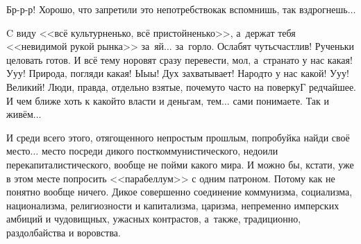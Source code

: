 Бр-р-р! Хорошо, что запретили это непотребство\mdash как вспомнишь, так вздрогнешь$\ldots$



C виду <<всё культурненько, всё пристойненько>>, а~держат тебя <<невидимой рукой рынка>> за~яй$\ldots$ за~горло. Ослабят чуть\mdash счастлив! Рученьки целовать готов. 
И всё тему норовят сразу перевести, мол, а~страна\sdash то у нас какая! У\sdash у\sdash у! Природа, погляди какая! Ы\sdash ы\sdash ы! Дух захватывает! Народ\sdash то у нас какой! У\sdash у\sdash у! Великий! Люди, правда, отдельно взятые, почему\sdash то часто на поверку\mdash Г редчайшее. И чем ближе хоть к какой\sdash то власти и деньгам, тем$\ldots$ сами понимаете. Так и живём$\ldots$

И среди всего этого, отягощенного непростым прошлым, попробуй\sdash ка найди своё место$\ldots$ место посреди дикого посткоммунистического, недо\sdash или пере\sdash  капиталистического, вообще не пойми какого мира. И можно бы, кстати, уже в этом месте попросить <<парабеллум>> с одним патроном. Потому как не понятно вообще ничего. Дикое совершенно соединение коммунизма, социализма, национализма, религиозности и капитализма, царизма, непременно имперских амбиций и чудовищных, ужасных контрастов, а~также, традиционно, раздолбайства и воровства. 

